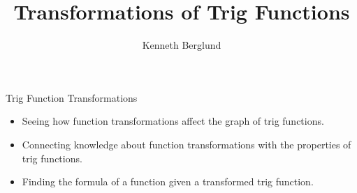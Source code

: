 \documentclass{ximera}
\author{Kenneth Berglund}
\title{Transformations of Trig Functions}
\begin{document}
\begin{abstract}
\end{abstract}
\maketitle


\begin{objectives}

	\item Trig Function Transformations
		\begin{itemize}
			\item Seeing how function transformations affect the graph of trig functions.
			\item Connecting knowledge about function transformations with the properties of trig functions.
			\item Finding the formula of a function given a transformed trig function.
		\end{itemize}
\end{objectives}
\end{document}
